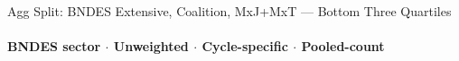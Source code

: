 \documentclass[aspectratio=169,10pt]{beamer}
\newcommand{\tbndes}{../tables/agg_firm_bndes_sector}
\begin{document}
\begin{frame}[t,shrink=5]{Agg Split: BNDES Extensive, Coalition, MxJ+MxT --- Bottom Three Quartiles}
\framesubtitle{BNDES sector $\cdot$ Unweighted $\cdot$ Cycle-specific $\cdot$ Pooled-count}
\begin{center}\footnotesize

\end{center}
\end{frame}
\end{document}
